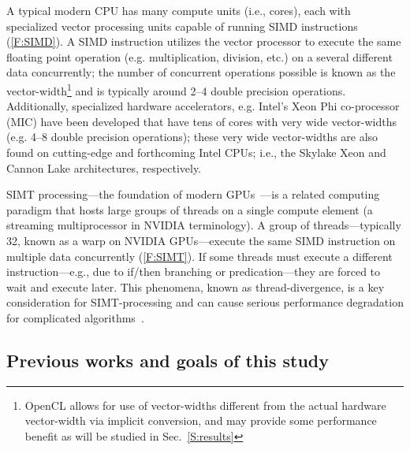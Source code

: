 \documentclass[12pt,number,sort&compress,preprint]{elsarticle}
\begin{document}
A typical modern CPU has many compute units (i.e., cores), each with specialized vector processing units capable of running SIMD instructions (\cref{F:SIMD}).
A SIMD instruction utilizes the vector processor to execute the same floating point operation (e.g. multiplication, division, etc.) on a several different data concurrently; the number of concurrent operations possible is known as the vector-width\footnote{OpenCL allows for use of vector-widths different from the actual hardware vector-width via implicit conversion, and may provide some performance benefit as will be studied in Sec.~\ref{S:results}} and is typically around 2--4 double precision operations. 
Additionally, specialized hardware accelerators, e.g. Intel's Xeon Phi co-processor (MIC) have been developed that have tens of cores with very wide vector-widths (e.g. 4--8 double precision operations); these very wide vector-widths are also found on cutting-edge and forthcoming Intel CPUs; i.e., the Skylake Xeon and Cannon Lake architectures, respectively.

SIMT processing---the foundation of modern GPUs~\cite{lindholm2008nvidia}---is a related computing paradigm that hosts large groups of threads on a single compute element (a streaming multiprocessor in NVIDIA terminology).
A group of threads---typically \num{32}, known as a warp on NVIDIA GPUs---execute the same SIMD instruction on multiple data concurrently (\cref{F:SIMT}).
If some threads must execute a different instruction---e.g., due to if\slash then branching or predication---they are forced to wait and execute later.
This phenomena, known as thread-divergence, is a key consideration for SIMT-processing and can cause serious performance degradation for complicated algorithms~\cite{CurtisGPU:2017}.

\subsection{Previous works and goals of this study}
\end{document}
